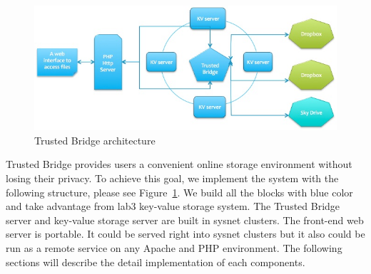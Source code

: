 
\begin{figure}[ht]
\centering
\includegraphics[width=5.2in]{pics/arch.png}
\caption{Trusted Bridge architecture}
\label{fig:arch}
\end{figure}

Trusted Bridge provides users a convenient online storage environment without losing their privacy. To achieve this goal, we implement the system with the following structure, please see Figure~\ref{fig:arch}. We build all the blocks with blue color and take advantage from lab3 key-value storage system. The Trusted Bridge server and key-value storage server are built in sysnet clusters. The front-end web server is portable. It could be served right into sysnet clusters but it also could be run as a remote service on any Apache and PHP environment. The following sections will describe the detail implementation of each components. 

